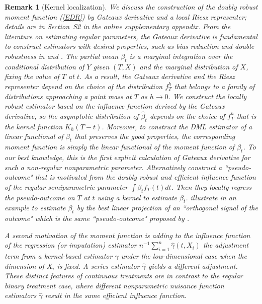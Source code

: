\documentclass[lettersize, 12pt]{article}
\newtheorem{remark}{Remark}
\begin{document}
\begin{remark}[Kernel localization]{\rm
We discuss the construction of the doubly robust moment function (\ref{EDR})
by Gateaux derivative and a local Riesz representer; details are in Section~S2 in the online supplementary appendix.
From the literature on estimating regular parameters, the Gateaux derivative is fundamental to construct estimators with desired properties, such as bias reduction and double robustness in \cite{CLV} and \cite{IchimuraNewey22QE}. 
The partial mean $\beta_t$ is a marginal integration over 
the conditional distribution of $Y$ given $(T,X)$ and the marginal distribution of $X$, fixing the value of $T$ at $t$.
As a result, the Gateaux derivative and the Riesz representer depend on the choice of the distribution $f_{T}^h$ that belongs to a family of distributions approaching a point mass at $T$ as $h \rightarrow 0$.
We construct the locally robust estimator based on the influence function derived by the Gateaux derivative, so the asymptotic distribution of $\hat\beta_t$ depends on the choice of $f_{T}^h$ that is the kernel function $K_h(T-t)$.
Moreover, to construct the DML estimator of a linear functional of $\beta_t$ that preserves the good properties, the corresponding moment function is simply the linear functional of the moment function of $\beta_t$.
To our best knowledge, this is the first explicit calculation of Gateaux derivative for such a non-regular nonparametric parameter.
Alternatively \cite{Kennedy} construct a ``pseudo-outcome" 
that is motivated from the doubly robust and efficient influence function of the regular semiparametric parameter $\int \beta_t f_T(t)dt$.
 Then they locally regress the pseudo-outcome on $T$ at $t$ using a kernel to estimate $\beta_t$.
\cite{SC} illustrate in an example to estimate $\beta_t$ by the best linear projection of  an ``orthogonal signal of the outcome" which is the same ``pseudo-outcome" proposed by \cite{Kennedy}.

A second motivation of the moment function is 
adding to the influence function of the regression (or imputation) estimator $n^{-1}\sum_{i=1}^n \hat \gamma(t, X_i)$
the adjustment term from a kernel-based estimator $\hat \gamma$ under the low-dimensional case when the dimension of $X_i$ is fixed.
A series estimator $\hat \gamma$ yields a different adjustment.
These distinct features of continuous treatments are in contrast to the regular binary treatment case, where different nonparametric nuisance function estimators $\hat\gamma$ result in the same efficient influence function.
}
\label{RGD}
\end{remark}
\end{document}

